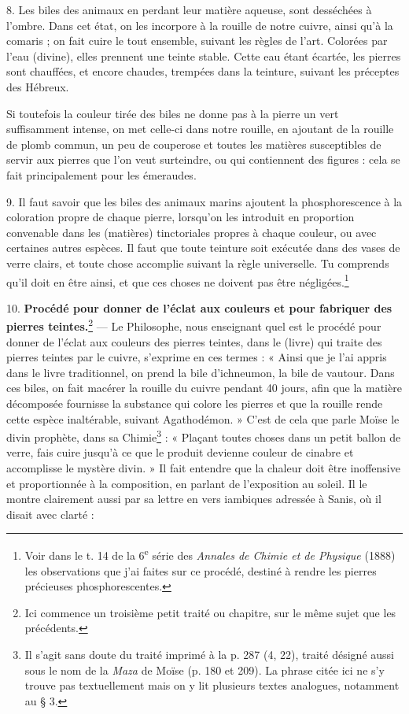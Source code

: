 \documentclass[a4paper, 11pt, oneside, polutonikogreek, french]{article}
\begin{document}
8. Les biles des animaux en perdant leur matière aqueuse, sont desséchées à l'ombre. Dans cet état, on les incorpore à la rouille de notre cuivre, ainsi qu'à la comaris ; on fait cuire le tout ensemble, suivant les règles de l'art. Colorées par l'eau (divine), elles prennent une teinte stable. Cette eau étant écartée, les pierres sont chauffées, et encore chaudes, trempées dans la teinture, suivant les préceptes des Hébreux.

Si toutefois la couleur tirée des biles ne donne pas à la pierre un vert suffisamment intense, on met celle-ci dans notre rouille, en ajoutant de la rouille de plomb commun, un peu de couperose et toutes les matières susceptibles de servir aux pierres que l'on veut surteindre, ou qui contiennent des figures : cela se fait principalement pour les émeraudes.

9. Il faut savoir que les biles des animaux marins ajoutent la phosphorescence à la coloration propre de chaque pierre, lorsqu'on les introduit en proportion convenable dans les (matières) tinctoriales propres à chaque couleur, ou avec certaines autres espèces. Il faut que toute teinture soit exécutée dans des vases de verre clairs, et toute chose accomplie suivant la règle universelle. Tu comprends qu'il doit en être ainsi, et que ces choses ne doivent pas être négligées.\footnote{Voir dans le t. 14 de la 6\textsuperscript{e} série des \emph{Annales de Chimie et de Physique} (1888) les observations que j'ai faites sur ce procédé, destiné à rendre les pierres précieuses phosphorescentes.}

10. \textbf{Procédé pour donner de l'éclat aux couleurs et pour fabriquer des pierres teintes.}\footnote{Ici commence un troisième petit traité ou chapitre, sur le même sujet que les précédents.} --- Le Philosophe, nous enseignant quel est le procédé pour donner de l'éclat aux couleurs des pierres teintes, dans le (livre) qui traite des pierres teintes par le cuivre, s'exprime en ces termes : « Ainsi que je l'ai appris dans le livre traditionnel, on prend la bile d'ichneumon, la bile de vautour. Dans ces biles, on fait macérer la rouille du cuivre pendant 40 jours, afin que la matière décomposée fournisse la substance qui colore les pierres et que la rouille rende cette espèce inaltérable, suivant Agathodémon. » C'est de cela que parle Moïse le divin prophète, dans sa Chimie\footnote{Il s'agit sans doute du traité imprimé à la p. 287 (4, 22), traité désigné aussi sous le nom de la \emph{Maza} de Moïse (p. 180 et 209). La phrase citée ici ne s'y trouve pas textuellement mais on y lit plusieurs textes analogues, notamment au § 3.} : « Plaçant toutes choses dans un petit ballon de verre, fais cuire jusqu'à ce que le produit devienne couleur de cinabre et accomplisse le mystère divin. » Il fait entendre que la chaleur doit être inoffensive et proportionnée à la composition, en parlant de l'exposition au soleil. Il le montre clairement aussi par sa lettre en vers iambiques adressée à Sanis, où il disait avec clarté :
\end{document}
